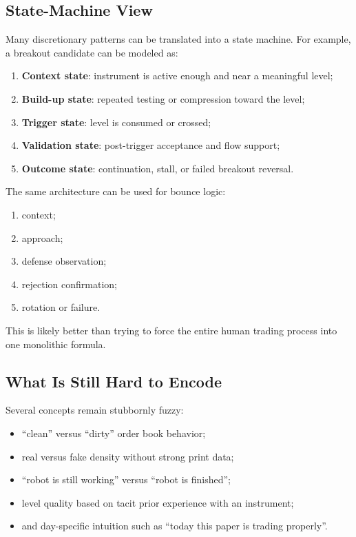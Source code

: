 \subsection{State-Machine View}

Many discretionary patterns can be translated into a state machine.
For example, a breakout candidate can be modeled as:
\begin{enumerate}
  \item \textbf{Context state}: instrument is active enough and near a meaningful level;
  \item \textbf{Build-up state}: repeated testing or compression toward the level;
  \item \textbf{Trigger state}: level is consumed or crossed;
  \item \textbf{Validation state}: post-trigger acceptance and flow support;
  \item \textbf{Outcome state}: continuation, stall, or failed breakout reversal.
\end{enumerate}

The same architecture can be used for bounce logic:
\begin{enumerate}
  \item context;
  \item approach;
  \item defense observation;
  \item rejection confirmation;
  \item rotation or failure.
\end{enumerate}

This is likely better than trying to force the entire human trading process into one monolithic formula.

\subsection{What Is Still Hard to Encode}

Several concepts remain stubbornly fuzzy:
\begin{itemize}
  \item ``clean'' versus ``dirty'' order book behavior;
  \item real versus fake density without strong print data;
  \item ``robot is still working'' versus ``robot is finished'';
  \item level quality based on tacit prior experience with an instrument;
  \item and day-specific intuition such as ``today this paper is trading properly''.
\end{itemize}

